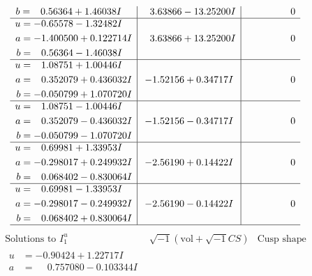 \documentclass[1p]{elsarticle_modified}
\theoremstyle{definition}
\newcommand{\I}{\sqrt{-1}}
\begin{document}
$$\begin{array}{c|c|c}
\begin{aligned}
b &= \phantom{-}0.56364 + 1.46038 I\end{aligned}
 & \phantom{-}3.63866 - 13.25200 I & \phantom{-0.000000 } 0 \\ \hline\begin{aligned}
u &= -0.65578 - 1.32482 I \\
a &= -1.400500 + 0.122714 I \\
b &= \phantom{-}0.56364 - 1.46038 I\end{aligned}
 & \phantom{-}3.63866 + 13.25200 I & \phantom{-0.000000 } 0 \\ \hline\begin{aligned}
u &= \phantom{-}1.08751 + 1.00446 I \\
a &= \phantom{-}0.352079 + 0.436032 I \\
b &= -0.050799 + 1.070720 I\end{aligned}
 & -1.52156 + 0.34717 I & \phantom{-0.000000 } 0 \\ \hline\begin{aligned}
u &= \phantom{-}1.08751 - 1.00446 I \\
a &= \phantom{-}0.352079 - 0.436032 I \\
b &= -0.050799 - 1.070720 I\end{aligned}
 & -1.52156 - 0.34717 I & \phantom{-0.000000 } 0 \\ \hline\begin{aligned}
u &= \phantom{-}0.69981 + 1.33953 I \\
a &= -0.298017 + 0.249932 I \\
b &= \phantom{-}0.068402 - 0.830064 I\end{aligned}
 & -2.56190 + 0.14422 I & \phantom{-0.000000 } 0 \\ \hline\begin{aligned}
u &= \phantom{-}0.69981 - 1.33953 I \\
a &= -0.298017 - 0.249932 I \\
b &= \phantom{-}0.068402 + 0.830064 I\end{aligned}
 & -2.56190 - 0.14422 I & \phantom{-0.000000 } 0\\
 \hline 
 \end{array}$$\newpage$$\begin{array}{c|c|c}  
\text{Solutions to }I^u_{1}& \I (\text{vol} + \sqrt{-1}CS) & \text{Cusp shape}\\
 \hline 
\begin{aligned}
u &= -0.90424 + 1.22717 I \\
a &= \phantom{-}0.757080 - 0.103344 I \\

\end{aligned}
\end{array}$$
\end{document}
